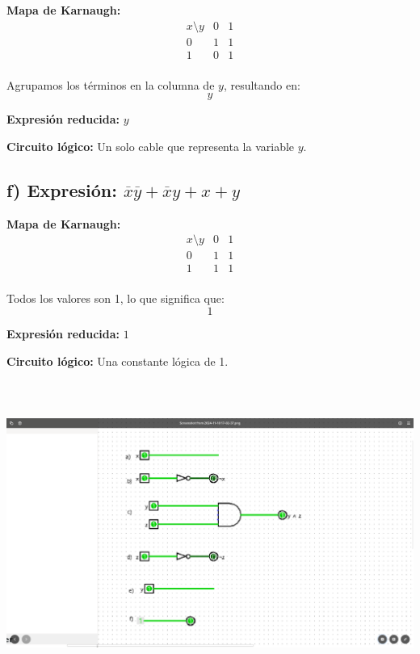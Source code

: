 \documentclass[11pt,letterpaper]{article}
\begin{document}
\textbf{Mapa de Karnaugh:}
\[
\begin{array}{c|cc}
x \setminus y & 0 & 1 \\
\hline
0 & 1 & 1 \\
1 & 0 & 1 \\
\end{array}
\]

Agrupamos los términos en la columna de \( y \), resultando en:
\[
y
\]

\textbf{Expresión reducida:} \( y \)

\textbf{Circuito lógico:} Un solo cable que representa la variable \( y \).

\subsection*{f) Expresión: \( \overline{x}\overline{y} + \overline{x}y + x + y \)}

\textbf{Mapa de Karnaugh:}
\[
\begin{array}{c|cc}
x \setminus y & 0 & 1 \\
\hline
0 & 1 & 1 \\
1 & 1 & 1 \\
\end{array}
\]

Todos los valores son 1, lo que significa que:
\[
1
\]

\textbf{Expresión reducida:} \( 1 \)

\textbf{Circuito lógico:} Una constante lógica de 1.

\includegraphics[height=10.0cm]{./imagenes/circuitos.png}
\end{document}
